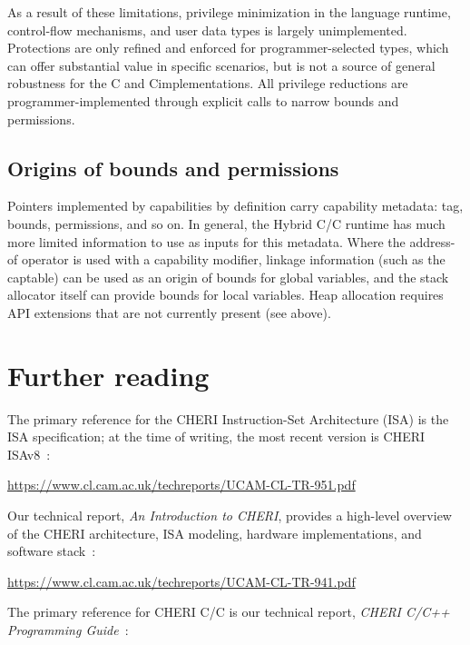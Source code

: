 \documentclass[12pt,twoside,openright,a4paper]{article}
\newcommand{\note}[2]{{\color{blue}[ Note: #1 - #2]}}
\renewcommand{\note}[2]{\relax\ifhmode\unskip\fi}
\newcommand{\psnote}[1]{\note{#1}{Peter S.}}
\newcommand*{\cpp}{\texorpdfstring{C\textsmaller[2]{\protect\nolinebreak[4]\hspace{-.05em}\raisebox{.45ex}{\textbf{++}}}}{C++}}
\newcommand*{\COrCpp}{C/\cpp{}}
\newcommand*{\purecapCOrCpp}{CHERI \COrCpp{}}
\newcommand*{\hybridCOrCpp}{Hybrid \COrCpp{}}
\begin{document}
As a result of these limitations, privilege minimization in the language
runtime, control-flow mechanisms, and user data types is largely unimplemented.
Protections are only refined and enforced for programmer-selected types, which
can offer substantial value in specific scenarios, but is not a source of
general robustness for the C and \cpp implementations.
All privilege reductions are programmer-implemented through explicit calls to
narrow bounds and permissions.

\subsection{Origins of bounds and permissions}

Pointers implemented by capabilities by definition carry capability metadata:
tag, bounds, permissions, and so on.
In general, the \hybridCOrCpp{} runtime has much more limited information to
use as inputs for this metadata.
\psnote{...than pure-capability CHERI C/C++ (hmm -- maybe it's worth still keeping the ``pure'' terminology for this document, to make such oppositions clear?)}
Where the address-of operator is used with a capability modifier, linkage
information (such as the captable) can be used as an origin of bounds for
global variables, and the stack allocator itself can provide bounds for local
variables.
Heap allocation requires API extensions that are not currently present (see
above).

\section{Further reading}
\label{sec:further_reading}

The primary reference for the CHERI Instruction-Set Architecture (ISA) is the
ISA specification; at the time of writing, the most recent version is CHERI
ISAv8~\cite{UCAM-CL-TR-951}:

\smallskip
\noindent
\url{https://www.cl.cam.ac.uk/techreports/UCAM-CL-TR-951.pdf}
\smallskip

\noindent
Our technical report, \textit{An Introduction to CHERI}, provides a high-level
overview of the CHERI architecture, ISA modeling, hardware implementations,
and software stack~\cite{UCAM-CL-TR-941}:

\smallskip
\noindent
\url{https://www.cl.cam.ac.uk/techreports/UCAM-CL-TR-941.pdf}
\smallskip

\noindent
The primary reference for \purecapCOrCpp{} is our technical report,
\textit{CHERI C/C++ Programming Guide}~\cite{UCAM-CL-TR-947}:
\end{document}
